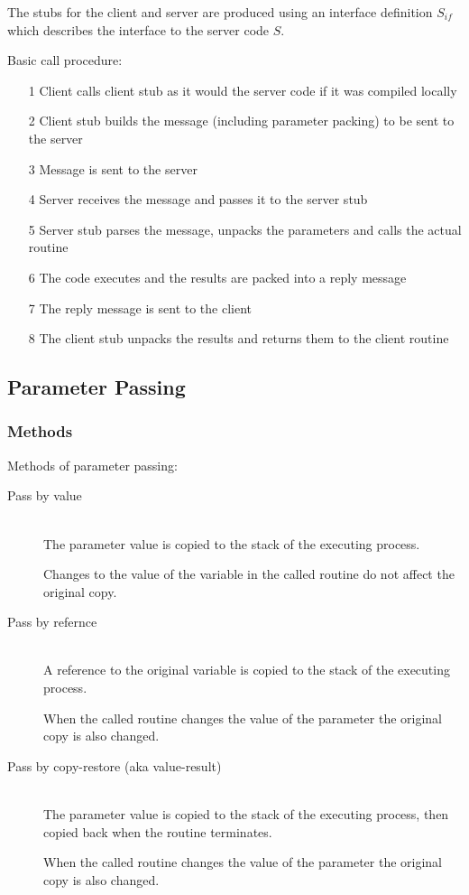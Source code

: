 \documentclass[a4paper]{article}
\begin{document}
The stubs for the client and server are produced using an interface definition
$S_{if}$ which describes the interface to the server code $S$.

Basic call procedure:

\begin{enumerate}
  \item[1] Client calls client stub as it would the server code if it was
           compiled locally
  \item[2] Client stub builds the message (including parameter packing) to be
           sent to the server
  \item[3] Message is sent to the server
  \item[4] Server receives the message and passes it to the server stub
  \item[5] Server stub parses the message, unpacks the parameters and calls the
           actual routine
  \item[6] The code executes and the results are packed into a reply message
  \item[7] The reply message is sent to the client
  \item[8] The client stub unpacks the results and returns them to the client
           routine
\end{enumerate}

\subsection{Parameter Passing}

\subsubsection{Methods}

Methods of parameter passing:

\begin{description}
  \item[Pass by value] \hfill \\
    The parameter value is copied to the stack of the executing process.

    Changes to the value of the variable in the called routine do not affect the
    original copy.

  \item[Pass by refernce] \hfill \\
    A reference to the original variable is copied to the stack of the executing
    process.

    When the called routine changes the value of the parameter the original copy
    is also changed.

  \item[Pass by copy-restore (aka value-result)] \hfill \\
    The parameter value is copied to the stack of the executing process, then
    copied back when the routine terminates.

    When the called routine changes the value of the parameter the original copy
    is also changed.

\end{description}
\end{document}
